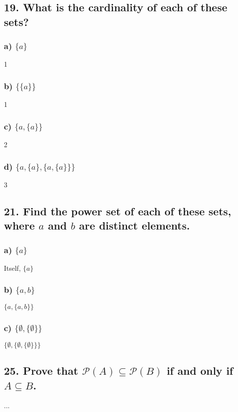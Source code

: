 \documentclass[11pt, oneside]{article} %
\numberwithin{equation}{section} %
\numberwithin{figure}{section} %
\numberwithin{table}{section} %
\begin{document}
\subsection{19. What is the cardinality of each of these sets?}
\subsubsection{a) $\{a\}$}
1
\subsubsection{b) $\{\{a\}\}$}
1
\subsubsection{c) $\{a, \{a\}\}$}
2
\subsubsection{d) $\{a, \{a\}, \{a, \{a\}\}\}$}
3

\subsection{21. Find the power set of each of these sets, where $a$ and $b$ are distinct elements.}
\subsubsection{a) $\{a\}$}
Itself, $\{a\}$
\subsubsection{b) $\{a,b\}$}
$\{a, \{a, b\}\}$
\subsubsection{c) $\{\emptyset,\{\emptyset\}\}$}
$\{\emptyset, \{\emptyset, \{\emptyset\}\}\}$

\subsection{25. Prove that $\mathcal{P}(A)\subseteq\mathcal{P}(B)$ if and only if $A\subseteq B$.}
...
\end{document}
